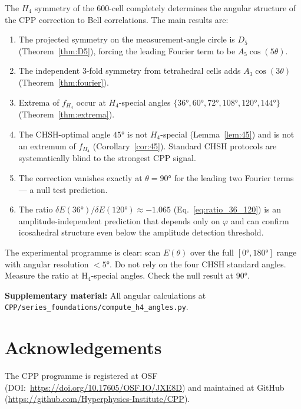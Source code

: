 \documentclass[11pt,letterpaper]{article}
\newcommand{\phig}{\varphi}
\begin{document}
The $H_4$ symmetry of the 600-cell completely determines the angular
structure of the CPP correction to Bell correlations.  The main
results are:

\begin{enumerate}
\item The projected symmetry on the measurement-angle circle is $D_5$
  (Theorem~\ref{thm:D5}), forcing the leading Fourier term to be
  $A_5\cos(5\theta)$.
\item The independent 3-fold symmetry from tetrahedral cells adds
  $A_3\cos(3\theta)$ (Theorem~\ref{thm:fourier}).
\item Extrema of $f_{H_4}$ occur at $H_4$-special angles $\{36°,
  60°, 72°, 108°, 120°, 144°\}$ (Theorem~\ref{thm:extrema}).
\item The CHSH-optimal angle $45°$ is not $H_4$-special
  (Lemma~\ref{lem:45}) and is not an extremum of $f_{H_4}$
  (Corollary~\ref{cor:45}).  Standard CHSH protocols are
  systematically blind to the strongest CPP signal.
\item The correction vanishes exactly at $\theta = 90°$ for the
  leading two Fourier terms --- a null test prediction.
\item The ratio $\delta E(36°)/\delta E(120°) \approx -1.065$
  (Eq.~\ref{eq:ratio_36_120}) is an amplitude-independent prediction
  that depends only on $\phig$ and can confirm icosahedral structure
  even below the amplitude detection threshold.
\end{enumerate}

The experimental programme is clear: scan $E(\theta)$ over the full
$[0°, 180°]$ range with angular resolution $< 5°$.  Do not rely on
the four CHSH standard angles.  Measure the ratio at H$_4$-special
angles.  Check the null result at $90°$.

\noindent\textbf{Supplementary material:} All angular calculations
at \texttt{CPP/series\_foundations/compute\_h4\_angles.py}.





\section*{Acknowledgements}
The CPP programme is registered at OSF (DOI:~\url{https://doi.org/10.17605/OSF.IO/JXE8D}) and maintained at GitHub (\url{https://github.com/Hyperphysics-Institute/CPP}).
\end{document}
